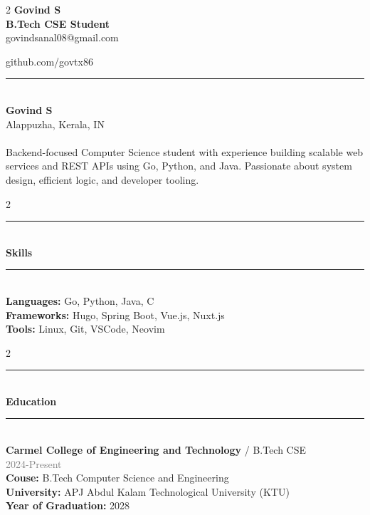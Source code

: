 \documentclass[10pt, a4paper]{article}
\begin{document}
\setlength{\columnsep}{0.05\textwidth}

\begin{paracol}{2}
\vspace*{0pt}
\textbf{\selectfont \huge Govind S} \\[7px]
\textbf{\selectfont \Large \textcolor{accentorange}{B.Tech CSE Student}} \\[10px]
govindsanal08@gmail.com

github.com/govtx86

\switchcolumn
\rule{\linewidth}{2pt} \\[10px]
\textbf{\selectfont Govind S} \\
\textcolor{accentorange}{Alappuzha, Kerala, IN}\\\\
Backend-focused Computer Science student with experience building scalable web services and REST APIs using Go, Python, and Java. Passionate about system design, efficient logic, and developer tooling.
\end{paracol}

\vspace{1em}

\begin{paracol}{2}
\rule{0.1\linewidth}{1pt} \\[10px]
\textbf{\selectfont \Large Skills} \\[5px]
\switchcolumn
\rule{\linewidth}{2pt} \\[10px]
\textbf{Languages:} Go, Python, Java, C \\
\textbf{Frameworks:} Hugo, Spring Boot, Vue.js, Nuxt.js\\
\textbf{Tools:} Linux, Git, VSCode, Neovim \\
\end{paracol}

\begin{paracol}{2}
\rule{0.1\linewidth}{1pt} \\[10px]
\textbf{\selectfont \Large Education} \\[5px]
\switchcolumn
\rule{\linewidth}{2pt} \\[10px]
\textbf{Carmel College of Engineering and Technology} / B.Tech CSE \\
\textcolor{gray}{2024-Present} \\
\textbf{Couse: } B.Tech Computer Science and Engineering \\
\textbf{University: } APJ Abdul Kalam Technological University (KTU) \\
\textbf{Year of Graduation: } 2028 \\
\end{paracol}
\end{document}
